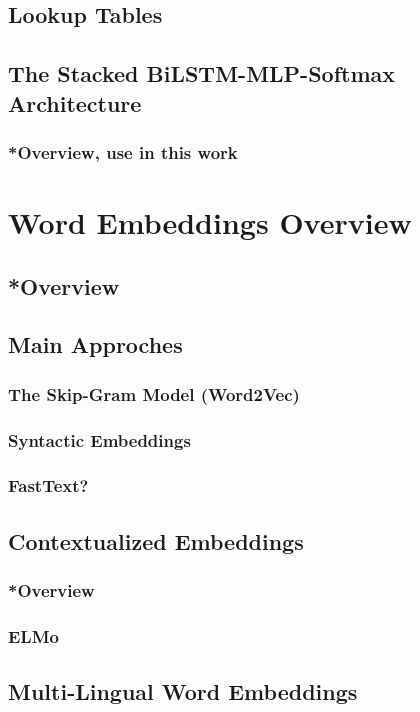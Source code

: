 \subsection{Lookup Tables}
\subsection{The Stacked BiLSTM-MLP-Softmax Architecture}
\subsubsection{*Overview, use in this work}
\pagebreak

\section{Word Embeddings Overview}
\subsection{*Overview}
\subsection{Main Approches}
\subsubsection{The Skip-Gram Model (Word2Vec)}
\subsubsection{Syntactic Embeddings}
\subsubsection{FastText?}
\subsection{Contextualized Embeddings}
\subsubsection{*Overview}
\subsubsection{ELMo}
\subsection{Multi-Lingual Word Embeddings}
